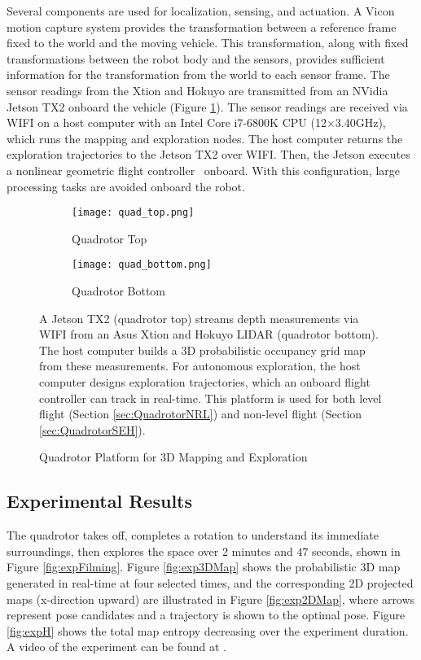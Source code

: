 Several components are used for localization, sensing, and actuation. A Vicon motion capture system provides the transformation between a reference frame fixed to the world and the moving vehicle. This transformation, along with fixed transformations between the robot body and the sensors, provides sufficient information for the transformation from the world to each sensor frame. The sensor readings from the Xtion and Hokuyo are transmitted from an NVidia Jetson TX2 onboard the vehicle (Figure \ref{fig:QuadrotorHardware}). The sensor readings are received via WIFI on a host computer with an Intel Core i7-6800K CPU (12$\times$3.40GHz), which runs the mapping and exploration nodes. The host computer returns the exploration trajectories to the Jetson TX2 over WIFI. Then, the Jetson executes a nonlinear geometric flight controller~\cite{GooDaeLee13} onboard. With this configuration, large processing tasks are avoided onboard the robot.
		
\begin{figure}[!t]
\centering
    	\begin{subfigure}[t]{0.44\columnwidth}
           	\centering
          	\texttt{[image: quad\_top.png]}
        		\caption{Quadrotor Top}
    	\end{subfigure}
	\hspace*{0.05\columnwidth}
    	\begin{subfigure}[t]{0.44\columnwidth}
           	\centering
          	\texttt{[image: quad\_bottom.png]}
        		\caption{Quadrotor Bottom}
    	\end{subfigure}
	\caption{Quadrotor Platform for 3D Mapping and Exploration}
	\medskip
	\small
	A Jetson TX2 (quadrotor top) streams depth measurements via WIFI from an Asus Xtion and Hokuyo LIDAR (quadrotor bottom). The host computer builds a 3D probabilistic occupancy grid map from these measurements. For autonomous exploration, the host computer designs exploration trajectories, which an onboard flight controller can track in real-time. This platform is used for both level flight (Section \ref{sec:QuadrotorNRL}) and non-level flight (Section \ref{sec:QuadrotorSEH}).
	\label{fig:QuadrotorHardware}
\end{figure}

\subsection{Experimental Results}
                
The quadrotor takes off, completes a rotation to understand its immediate surroundings, then explores the space over $2$ minutes and $47$ seconds, shown in Figure \ref{fig:expFilming}. Figure \ref{fig:exp3DMap} shows the probabilistic 3D map generated in real-time at four selected times, and the corresponding 2D projected maps (x-direction upward) are illustrated in Figure \ref{fig:exp2DMap}, where arrows represent pose candidates and a trajectory is shown to the optimal pose. Figure \ref{fig:expH} shows the total map entropy decreasing over the experiment duration. A video of the experiment can be found at \href{https://www.youtube.com/watch?v=I_1rXV2XRqk}{}.


